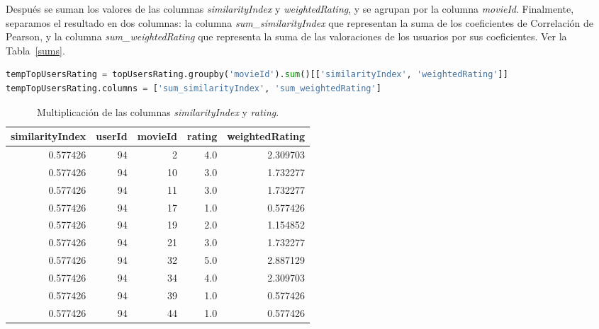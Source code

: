 \documentclass{uimppracticas}
\begin{document}
Después se suman los valores de las columnas \textit{similarityIndex} y \textit{weightedRating}, y se agrupan por la columna \textit{movieId}. Finalmente, separamos el resultado en dos columnas: la columna \textit{sum\_similarityIndex} que representan la suma de los coeficientes de Correlación de Pearson, y la columna \textit{ sum\_weightedRating} que representa la suma de las valoraciones de los usuarios por sus coeficientes. Ver la Tabla~\ref{sums}.

\begin{lstlisting}[language=python, basicstyle=\small]
tempTopUsersRating = topUsersRating.groupby('movieId').sum()[['similarityIndex', 'weightedRating']]
tempTopUsersRating.columns = ['sum_similarityIndex', 'sum_weightedRating']
\end{lstlisting} 


\begin{table}[H]
	\centering
	\begin{tabular}{rrrrr}
		\toprule
		similarityIndex &  userId &  movieId &  rating &  weightedRating \\
		\midrule
		0.577426 &      94 &        2 &     4.0 &        2.309703 \\
		0.577426 &      94 &       10 &     3.0 &        1.732277 \\
		0.577426 &      94 &       11 &     3.0 &        1.732277 \\
		0.577426 &      94 &       17 &     1.0 &        0.577426 \\
		0.577426 &      94 &       19 &     2.0 &        1.154852 \\
		0.577426 &      94 &       21 &     3.0 &        1.732277 \\
		0.577426 &      94 &       32 &     5.0 &        2.887129 \\
		0.577426 &      94 &       34 &     4.0 &        2.309703 \\
		0.577426 &      94 &       39 &     1.0 &        0.577426 \\
		0.577426 &      94 &       44 &     1.0 &        0.577426 \\
		\bottomrule
	\end{tabular}
	\caption{Multiplicación de las columnas \textit{similarityIndex} y \textit{rating}.}
	\label{weightedRating}
\end{table}
\end{document}
